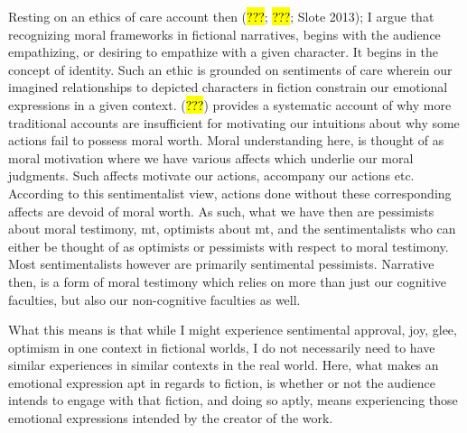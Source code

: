 \documentclass[
  letterpaper,
  DIV=11,
  numbers=noendperiod]{scrartcl}
\theoremstyle{remark}
\begin{document}
Resting on an ethics of care account then (\hl{???}; \hl{???}; Slote
2013); I argue that recognizing moral frameworks in fictional
narratives, begins with the audience empathizing, or desiring to
empathize with a given character. It begins in the concept of identity.
Such an ethic is grounded on sentiments of care wherein our imagined
relationships to depicted characters in fiction constrain our emotional
expressions in a given context. (\hl{???}) provides a systematic account
of why more traditional accounts are insufficient for motivating our
intuitions about why some actions fail to possess moral worth. Moral
understanding here, is thought of as moral motivation where we have
various affects which underlie our moral judgments. Such affects
motivate our actions, accompany our actions etc. According to this
sentimentalist view, actions done without these corresponding affects
are devoid of moral worth. As such, what we have then are pessimists
about moral testimony, mt, optimists about mt, and the sentimentalists
who can either be thought of as optimists or pessimists with respect to
moral testimony. Most sentimentalists however are primarily sentimental
pessimists. Narrative then, is a form of moral testimony which relies on
more than just our cognitive faculties, but also our non-cognitive
faculties as well.

What this means is that while I might experience sentimental approval,
joy, glee, optimism in one context in fictional worlds, I do not
necessarily need to have similar experiences in similar contexts in the
real world. Here, what makes an emotional expression apt in regards to
fiction, is whether or not the audience intends to engage with that
fiction, and doing so aptly, means experiencing those emotional
expressions intended by the creator of the work.
\end{document}
